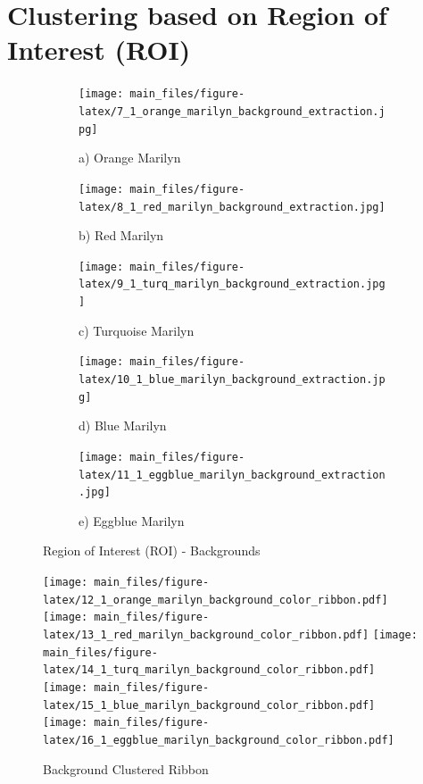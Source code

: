 \documentclass{article}
\begin{document}
\hypertarget{clustering-based-on-region-of-interest-roi}{%
\section{Clustering based on Region of Interest
(ROI)}\label{clustering-based-on-region-of-interest-roi}}

\begin{figure}[htbp]
    \centering
    \begin{subfigure}[b]{0.19\textwidth}
        \texttt{[image: main\_files/figure-latex/7\_1\_orange\_marilyn\_background\_extraction.jpg]}
        \caption*{a) Orange Marilyn}
    \end{subfigure}
    \hfill
    \begin{subfigure}[b]{0.19\textwidth}
        \texttt{[image: main\_files/figure-latex/8\_1\_red\_marilyn\_background\_extraction.jpg]}
        \caption*{b) Red Marilyn}
    \end{subfigure}
    \hfill
    \begin{subfigure}[b]{0.19\textwidth}
        \texttt{[image: main\_files/figure-latex/9\_1\_turq\_marilyn\_background\_extraction.jpg]}
        \caption*{c) Turquoise Marilyn}
    \end{subfigure}
    \hfill
    \begin{subfigure}[b]{0.19\textwidth}
        \texttt{[image: main\_files/figure-latex/10\_1\_blue\_marilyn\_background\_extraction.jpg]}
        \caption*{d) Blue Marilyn}
    \end{subfigure}
    \hfill
    \begin{subfigure}[b]{0.19\textwidth}
        \texttt{[image: main\_files/figure-latex/11\_1\_eggblue\_marilyn\_background\_extraction.jpg]}
        \caption*{e) Eggblue Marilyn}
    \end{subfigure}
    
    \caption{Region of Interest (ROI) - Backgrounds}
\end{figure}

\begin{figure}[htbp]
    \centering
        {\texttt{[image: main\_files/figure-latex/12\_1\_orange\_marilyn\_background\_color\_ribbon.pdf]}}
        {\texttt{[image: main\_files/figure-latex/13\_1\_red\_marilyn\_background\_color\_ribbon.pdf]}}
        {\texttt{[image: main\_files/figure-latex/14\_1\_turq\_marilyn\_background\_color\_ribbon.pdf]}}
        {\texttt{[image: main\_files/figure-latex/15\_1\_blue\_marilyn\_background\_color\_ribbon.pdf]}}
        {\texttt{[image: main\_files/figure-latex/16\_1\_eggblue\_marilyn\_background\_color\_ribbon.pdf]}}
    \caption{Background Clustered Ribbon}
\end{figure}
\end{document}
